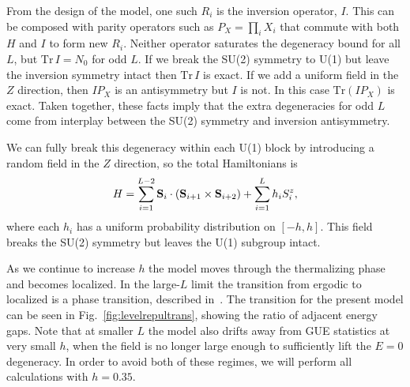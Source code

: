 \documentclass[aps,prx,reprint,superscriptaddress, longbibliography]{revtex4-1}
\newcommand{\Tr}{ \mbox{Tr}}
\begin{document}
From the design of the model, one such $R_i$ is the inversion operator, $I$. This can be composed with parity operators such as $P_X=\prod_i X_i$ that commute with both $H$ and $I$ to form new $R_i$. Neither operator saturates the degeneracy bound for all $L$, but $\Tr\,I=N_0$ for odd $L$. If we break the SU(2) symmetry to U(1) but leave the inversion symmetry intact then $\Tr\,I$ is exact. If we add a uniform field in the $Z$ direction, then $IP_X$ is an antisymmetry but $I$ is not. In this case $\Tr(IP_X)$ is exact. Taken together, these facts imply that the extra degeneracies for odd $L$ come from interplay between the SU(2) symmetry and inversion antisymmetry.


We can fully break this degeneracy within each U(1) block by introducing a random field in the $Z$ direction, so the total Hamiltonians is
\begin{align}
H = \sum_{i=1}^{L-2}{\bf S}_i\cdot({\bf S}_{i+1}\times {\bf S}_{i+2}) + 
	\sum_{i=1}^{L}h_iS_i^z,
\end{align}
where each $h_i$ has a uniform probability distribution on $[-h,h]$. This field breaks the SU(2) symmetry but leaves the U(1) subgroup intact.

As we continue to increase $h$ the model moves through the thermalizing phase and becomes localized. In the large-$L$ limit the transition from ergodic to localized is a phase transition, described in~\cite{1010.1992v1}. The transition for the present model can be seen in Fig.~\ref{fig:levelrepultrans}, showing the ratio of adjacent energy gaps. Note that at smaller $L$ the model also drifts away from GUE statistics at very small $h$, when the field is no longer large enough to sufficiently lift the $E=0$ degeneracy. In order to avoid both of these regimes, we will perform all calculations with $h=0.35$.
\end{document}
